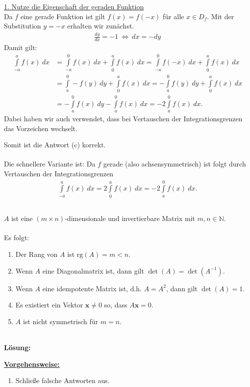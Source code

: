 \underline{1. Nutze die Eigenschaft der geraden Funktion }\\
Da $f$ eine gerade Funktion ist gilt $f(x) = f(-x)$ für alle $x \in D_f$.
Mit der Substitution $y = -x $ erhalten wir zunächst.
\begin{align*}
	\frac{dy}{dx} = -1 
	\ \Leftrightarrow \
	dx = - dy
\end{align*}
Damit gilt:
\begin{align*}
	\int \limits_{- a}^a f(x) \ dx
	&=
	\int \limits_{-a}^0 f(x) \ dx
	+ 
	\int \limits_{0}^a f(x) \ dx
	=
	\int \limits_{-a}^0 f(-x) \ dx
	+ 
	\int \limits_{0}^a f(x) \ dx\\
	&=
	\int \limits_{a}^0 -f(y) \ dy
	+ 
	\int \limits_{0}^a f(x) \ dx
	=
	-\int \limits_{a}^0 f(y) \ dy
	+ 
	\int \limits_{0}^a f(x) \ dx\\
	&=
	-\int \limits_{a}^0 f(x) \ dy
	- 
	\int \limits_{a}^0 f(x) \ dx
	= 
	-2 
	\int \limits_{a}^0 f(x) \ dx.
\end{align*}
Dabei haben wir auch verwendet, dass bei Vertauschen der Integrationsgrenzen das Vorzeichen wechselt.

Somit ist die Antwort (c) korrekt.\\
\\
Die schnellere Variante ist:
Da $f$ gerade (also achsensymmetrisch) ist folgt durch Vertauschen der Integrationsgrenzen
\begin{align*}
	\int \limits_{- a}^a f(x) \ dx
	=
	2 \int \limits_{0}^a f(x) \ dx
	= 
	- 2 \int \limits_{a}^0 f(x) \ dx.
\end{align*}


\newpage
\subsection*{}
$A$ ist eine $(m \times n)$-dimensionale und invertierbare Matrix mit $m,n \in \mathbb{N}$.\\
\\
Es folgt:
\renewcommand{\labelenumi}{(\alph{enumi})}
\begin{enumerate}
	\item 
	Der Rang von $A$ ist $\mathrm{rg}(A) = m < n$.
	\item 
	Wenn $A$ eine Diagonalmatrix ist, dann gilt $\det(A) = \det(A^{-1})$.
	\item 
	Wenn $A$ eine idempotente Matrix ist, d.h. $A = A^2$, dann gilt $\det(A) = 1$.
	\item 
	Es existiert ein Vektor $\mathbf{x} \neq 0$ so, dass $A \mathbf{x} = 0$.
	\item 
	$A$ ist nicht symmetrisch  für $m=n$. 
\end{enumerate}
\ \\
\textbf{Lösung:}
\begin{mdframed}
\underline{\textbf{Vorgehensweise:}}
\renewcommand{\labelenumi}{\theenumi.}
\begin{enumerate}
\item Schließe falsche Antworten aus.
\end{enumerate}
\end{mdframed}

